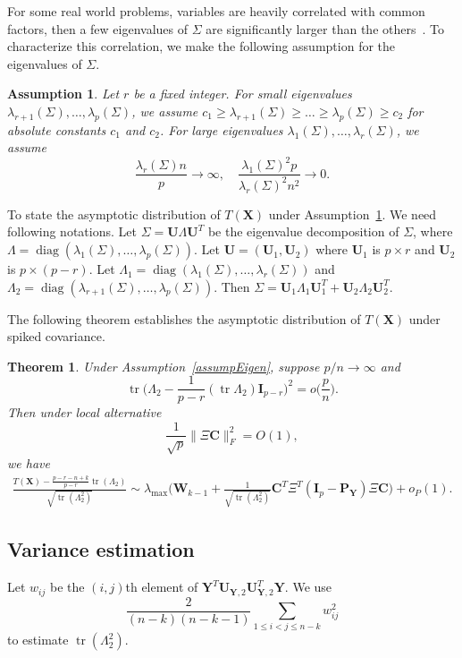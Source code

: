 \documentclass[12pt]{article} %
\DeclareMathOperator{\mytr}{tr}
\DeclareMathOperator{\mydiag}{diag}
\newcommand{\bX}{\mathbf{X}}
\newcommand{\bP}{\mathbf{P}}
\newcommand{\bY}{\mathbf{Y}}
\newcommand{\bC}{\mathbf{C}}
\newcommand{\bI}{\mathbf{I}}
\newcommand{\bU}{\mathbf{U}}
\newcommand{\bW}{\mathbf{W}}
\newtheorem{assumption}{Assumption}
\newtheorem{theorem}{Theorem}
\theoremstyle{definition}
\begin{document}
For some real world problems, variables are heavily correlated with common factors, then a few eigenvalues of $\Sigma$ are significantly larger than the others~\cite{Ma2015A}.
To characterize this correlation, we make the following assumption for the eigenvalues of $\Sigma$.

\begin{assumption}\label{assumpEigen}
    Let $r$ be a fixed integer.
    For small eigenvalues $\lambda_{r+1}(\Sigma),\ldots,\lambda_p(\Sigma)$, we assume
 $c_1 \geq \lambda_{r+1}(\Sigma) \geq \ldots \geq \lambda_{p}(\Sigma) \geq c_2$ for absolute constants $c_1$ and $c_2$.
    For large eigenvalues $\lambda_1(\Sigma),\ldots,\lambda_r(\Sigma)$,
    we assume 
    $$\frac{\lambda_r(\Sigma) n}{p}\to \infty,\quad
    \frac{\lambda_1(\Sigma)^2 p}{\lambda_r(\Sigma)^2 n^2}\to 0.$$
\end{assumption}


To state the asymptotic distribution of $T(\bX)$ under Assumption~\ref{assumpEigen}.
We need following notations.
Let $\Sigma= \bU\Lambda \bU^T$ be the eigenvalue decomposition of $\Sigma$, where $\Lambda =\mydiag (\lambda_1(\Sigma),\ldots,\lambda_p(\Sigma))$.
Let $\bU=(\bU_1,\bU_2)$ where $\bU_1$ is $p\times r$ and $\bU_2$ is $p\times (p-r)$.
Let $\Lambda_1=\mydiag(\lambda_1(\Sigma),\ldots,\lambda_r(\Sigma))$ and $\Lambda_2=\mydiag(\lambda_{r+1}(\Sigma),\ldots,\lambda_p(\Sigma))$.
Then $\Sigma=\bU_1\Lambda_1 \bU_1^T+\bU_2\Lambda_2 \bU_2^T$.

The following theorem establishes the asymptotic distribution of $T(\bX)$ under spiked covariance.
\begin{theorem}\label{thm1}
    Under Assumption~\eqref{assumpEigen}, suppose $p/n\to \infty$ and
    $$
    \mytr\Big(\Lambda_2-\frac{1}{p-r}(\mytr \Lambda_2)\bI_{p-r}\Big)^2=o\big(\frac{p}{n}\big).
    $$
    Then under local alternative
    \begin{equation*}
        \frac{1}{\sqrt{p}}\|\Xi \bC\|_F^2=O(1),
    \end{equation*}
    we have
    $$
    \begin{aligned}
        \frac{T(\bX)-\frac{p-r-n+k}{p-r}\mytr(\Lambda_2)}{\sqrt{\mytr (\Lambda_2^2)}}
        \sim
        \lambda_{\max}\Big(\bW_{k-1}+\tfrac{1}{\sqrt{\mytr(\Lambda_2^2)}} \bC^T \Xi^T (\bI_p-\bP_{\bY})\Xi \bC\Big)
        +o_P(1).
    \end{aligned}
    $$
\end{theorem}


\subsection{Variance estimation}
Let $w_{ij}$ be the $(i,j)$th element of $\bY^T \bU_{\bY,2} \bU_{\bY,2}^T \bY$.
We use
$$\frac{2}{(n-k)(n-k-1)}\sum_{1\leq i<j\leq n-k}w_{ij}^2$$
to estimate $\mytr(\Lambda_2^2)$.
\end{document}
